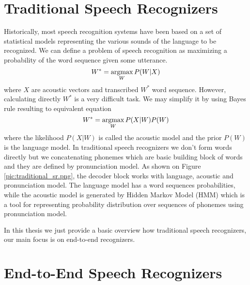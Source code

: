 

\section{Traditional Speech Recognizers}


Historically, most speech recognition systems have been based on a set of statistical models representing the various sounds of the language to be recognized.
We can define a problem of speech recognition as maximizing a probability of the word sequence given some utterance.
\[ W^{*} = \operatorname*{argmax}_W P(W|X) \]
where $X$ are acoustic vectors and transcribed $W^{*}$ word sequence.
However, calculating directly $W^{*}$ is a very difficult task. We may simplify it by using Bayes rule resulting to equivalent equation
\[ W^{*} = \operatorname*{argmax}_W {P(X|W)P(W)} \]
where the likelihood $P(X|W)$ is called the acoustic model and the prior $P(W)$ is the language model.
In traditional speech recognizers we don't form words directly but we concatenating phonemes which are basic building block of words and they are defined by pronunciation model.
As shown on Figure \ref{pic:traditional_sr.png}, the decoder block works with language, acoustic and pronunciation model.
The language model has a word sequences probabilities, while the acoustic model is generated by Hidden Markov Model (HMM) which is a tool for representing probability distribution over sequences of phonemes using pronunciation model\cite{hmm_sr}.

In this thesis we just provide a basic overview how traditional speech recognizers, our main focus is on end-to-end recognizers.


\section{End-to-End Speech Recognizers}

